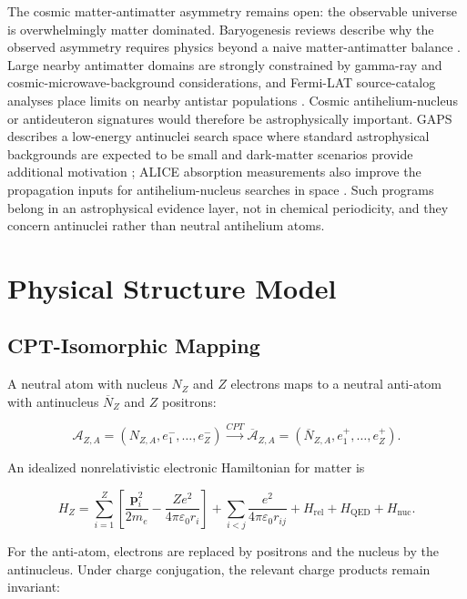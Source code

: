 \documentclass[11pt,a4paper]{article}
\begin{document}
The cosmic matter-antimatter asymmetry remains open: the observable universe is overwhelmingly matter dominated. Baryogenesis reviews describe why the observed asymmetry requires physics beyond a naive matter-antimatter balance \cite{RiottoTrodden1999,BodekerBuchmuller2021}. Large nearby antimatter domains are strongly constrained by gamma-ray and cosmic-microwave-background considerations, and Fermi-LAT source-catalog analyses place limits on nearby antistar populations \cite{Cohen1998,Dupourque2021}. Cosmic antihelium-nucleus or antideuteron signatures would therefore be astrophysically important. GAPS describes a low-energy antinuclei search space where standard astrophysical backgrounds are expected to be small and dark-matter scenarios provide additional motivation \cite{Saffold2021}; ALICE absorption measurements also improve the propagation inputs for antihelium-nucleus searches in space \cite{ALICE2023}. Such programs belong in an astrophysical evidence layer, not in chemical periodicity, and they concern antinuclei rather than neutral antihelium atoms.

\section{Physical Structure Model}

\subsection{CPT-Isomorphic Mapping}

A neutral atom with nucleus $N_Z$ and $Z$ electrons maps to a neutral anti-atom with antinucleus $\overline{N}_Z$ and $Z$ positrons:

\begin{equation}
\mathcal{A}_{Z,A}
=
\left(N_{Z,A},e^-_1,\ldots,e^-_Z\right)
\xrightarrow{CPT}
\overline{\mathcal{A}}_{Z,A}
=
\left(\overline{N}_{Z,A},e^+_1,\ldots,e^+_Z\right).
\end{equation}

An idealized nonrelativistic electronic Hamiltonian for matter is

\begin{equation}
H_Z
=
\sum_{i=1}^{Z}
\left[
\frac{\mathbf{p}_i^2}{2m_e}
-
\frac{Z e^2}{4\pi\varepsilon_0 r_i}
\right]
+
\sum_{i<j}
\frac{e^2}{4\pi\varepsilon_0 r_{ij}}
+
H_{\mathrm{rel}}+H_{\mathrm{QED}}+H_{\mathrm{nuc}} .
\end{equation}

For the anti-atom, electrons are replaced by positrons and the nucleus by the antinucleus. Under charge conjugation, the relevant charge products remain invariant:
\end{document}
